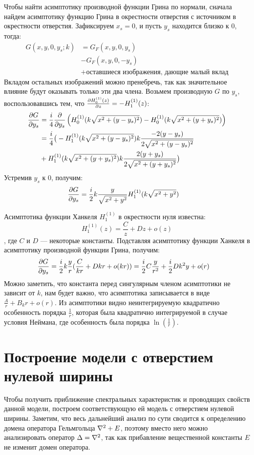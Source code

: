 Чтобы найти асимптотику производной функции Грина по нормали, сначала найдем асимптотику функцию Грина в окрестности отверстия с источником в окрестности отверстия. Зафиксируем $x_s = 0$, и пусть $y_s$ находится близко к $0$, тогда:
\begin{align*}
G(x, y, 0, y_s; k)
&= G_F(x, y, 0, y_s) \\
&- G_F(x, y, 0, -y_s) \\
&+ \text{оставшиеся изображения, дающие малый вклад}
\end{align*}
Вкладом остальных изображений можно пренебречь, так как значительное влияние будут оказывать только эти два члена. Возьмем производную $G$ по $y_s$, воспользовавшись тем, что $\pdv{H_{0}^{(1)}(z)}{z} = - H_{1}^{(1)}(z)$:
\begin{align*}
\pdv{G}{y_s}
&= \frac{i}{4} \pdv{}{y_s} \left( H_{0}^{(1)}(k \sqrt{x^2 + (y - y_s)^2}) - H_{0}^{(1)}(k \sqrt{x^2 + (y + y_s)^2}) \right) \\
&= \frac{i}{4} \big( -H_{1}^{(1)}(k \sqrt{x^2 + (y - y_s)^2}) k \frac{-2 (y - y_s)}{2 \sqrt{x^2 + (y - y_s)^2}} \\
&+ H_{1}^{(1)}(k \sqrt{x^2 + (y + y_s)^2}) k \frac{2 (y + y_s)}{2 \sqrt{x^2 + (y + y_s)^2}} \big)
\end{align*}
Устремив $y_s$ к 0, получим:
\begin{align*}
\pdv{G}{y_s} (x, y, 0, 0; k)
&= \frac{i}{2} k \frac{y}{\sqrt{x^2 + y^2}} H_{1}^{(1)}(k \sqrt{x^2 + y^2})
\end{align*}

Асимптотика функции Ханкеля $H_1^{(1)}$ в окрестности нуля известна:
\[
H_1^{(1)}(z) = \frac{C}{z} + D z + o(z)
\]
, где $C$ и $D$ — некоторые константы. Подставляя асимптотику функции Ханкеля в асимптотику производной функции Грина, получим:
\begin{align*}
\pdv{G}{y_s} (x, y, 0, 0; k)
&= \frac{i}{2} k \frac{y}{r} (\frac{C}{k r} + D k r + o(kr)) = \frac{i}{2} C \frac{y}{r^2} + \frac{i}{2} D k^2 y + o(r)
\end{align*} 
Можно заметить, что константа перед сингулярным членом асимптотики не зависит от $k$, нам будет важно, что асимптотика записывается в виде $\frac{A}{r} + B_k r + o(r)$. Из асимптотики видно неинтегрируемую квадратично особенность порядка $\frac{1}{r}$, которая была квадратично интегрируемой в случае условия Неймана, где особенность была порядка $\ln(\frac{1}{r})$.

\section{Построение модели с отверстием нулевой ширины}
Чтобы получить приближение спектральных характеристик и проводящих свойств данной модели, построем соответствующую ей модель с отверстием нулевой ширины. Заметим, что весь дальнейший анализ по сути сводится к определению домена оператора Гельмгольца $\laplacian + E$, поэтому вместо него можно анализировать оператор $\Delta = \laplacian$, так как прибавление вещественной константы $E$ не изменит домен оператора.

